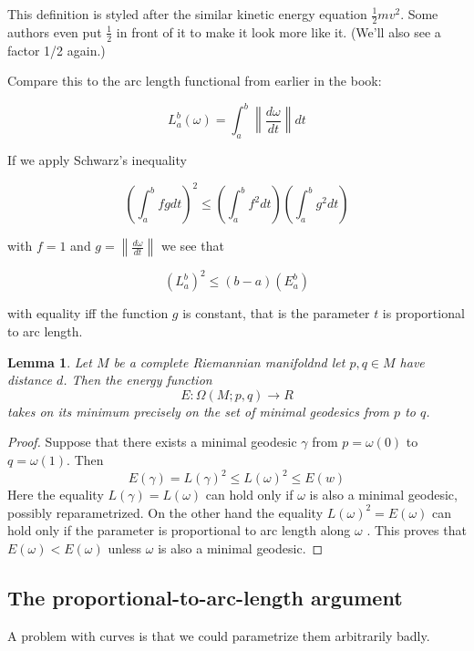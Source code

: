 \documentclass{article}
\newtheorem{lem}{Lemma}
\newtheorem{proof}{Proof}
\newcommand{\Absbars}[1]{\left\lVert#1\right\rVert}
\newcommand{\rmfd}[1]{Riemannian manifold}
\begin{document}
This definition is styled after the similar kinetic energy equation
$\frac{1}{2}mv^2$.  Some authors even put $\frac{1}{2}$ in front of it to make
it look more like it. (We'll also see a factor 1/2 again.)

Compare this to the arc length functional from earlier in the book:

\[
     L_a^b(\omega) = \int_a^b \Absbars{\frac{d\omega}{dt}} dt
\]

If we apply Schwarz's inequality

\[
    \left( \int_a^b fg dt \right)^2
    \leq
    \left( \int_a^b f^2 dt \right)    \left( \int_a^b g^2 dt \right)
\]

with $f = 1$ and $g = \Absbars{\frac{d\omega}{dt}}$ we see that

\[
    \left( L_a^b \right)^2
    \leq
    (b - a)\left( E_a^b \right)
\]

with equality iff the function $g$ is constant, that is the parameter $t$ is
proportional to arc length.

\begin{lem}
    \label{lem:geod-min}
    Let $M$ be a complete \rmfd and let $p,q \in M$ have distance $d$. Then the energy function
    \[
        E: \Omega(M;p,q) \rightarrow R
    \]
    takes on its minimum precisely on the set of minimal geodesics from $p$ to $q$.
\end{lem}


\begin{proof}
    Suppose that there exists a minimal geodesic $\gamma$ from $p = \omega(0)$
    to $q = \omega ( 1 )$. Then
    \[E(\gamma) = L(\gamma)^2 \leq L( \omega )^2 \leq E(w) \]
    Here the equality $L( \gamma ) = L(\omega)$ can hold only if $\omega$ is also a minimal
    geodesic, possibly reparametrized.
    On the other hand the equality $L ( \omega )^2 = E( \omega)$ can hold only if the parameter is proportional
    to arc length along $\omega$ . This proves that $E ( \omega ) < E(\omega)$ unless $\omega$ is also
    a minimal geodesic.
\end{proof}







\subsection{The proportional-to-arc-length argument}

A problem with curves is that we could parametrize them arbitrarily badly.
\end{document}
